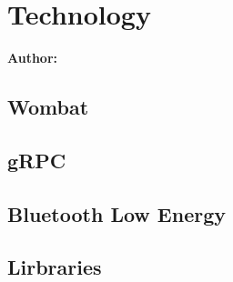 \chapter{Technology}

\textbf{Author: }

\section{Wombat}

\section{gRPC}

\section{Bluetooth Low Energy}

\section{Lirbraries}

\filbreak
